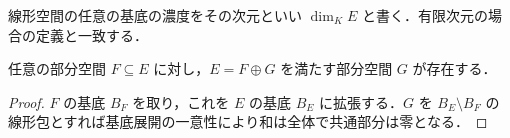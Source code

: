 \begin{defn}[線形空間の次元]
線形空間の任意の基底の濃度をその次元といい $\dim_K E$ と書く．有限次元の場合の定義と一致する．
\end{defn}
\begin{prop}[部分空間の代数的補空間]
任意の部分空間 $F\subseteq E$ に対し，$E=F\oplus G$ を満たす部分空間 $G$ が存在する．
\end{prop}
\begin{proof}
$F$ の基底 $B_F$ を取り，これを $E$ の基底 $B_E$ に拡張する．$G$ を $B_E\setminus B_F$ の線形包とすれば基底展開の一意性により和は全体で共通部分は零となる．
\end{proof}
